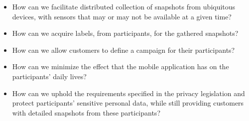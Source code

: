 



\begin{itemize}
	\setlength\itemsep{-0.2em}
    \item How can we facilitate distributed collection of snapshots from ubiquitous devices, with sensors that may or may not be available at a given time?

    \item How can we acquire labels, from participants, for the gathered snapshots?  
    
    \item How can we allow customers to define a campaign for their participants?
    
    \item How can we minimize the effect that the mobile application has on the participants’ daily lives?

    \item How can we uphold the requirements specified in the privacy legislation and protect participants' sensitive personal data, while still providing customers with detailed snapshots from these participants? 
\end{itemize}

